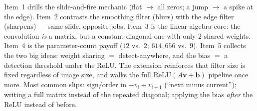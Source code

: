 \documentclass[10pt]{article}
\newcommand{\vv}{\mathbf{v}}
\newcommand{\bb}{\mathbf{b}}
\newcommand{\relu}{\mathrm{ReLU}}
\begin{document}
\begin{teachernote}
Item~1 drills the slide-and-fire mechanic (flat $\to$ all zeros; a jump $\to$ a spike at the edge). Item~2
contrasts the smoothing filter (blurs) with the edge filter (sharpens) --- same slide, opposite jobs. Item~3
is the linear-algebra core: the convolution \emph{is} a matrix, but a constant-diagonal one with only $2$
shared weights. Item~4 is the parameter-count payoff ($12$ vs.\ $2$; $614{,}656$ vs.\ $9$). Item~5 collects
the two big ideas: weight sharing $=$ detect-anywhere, and the bias $=$ a detection threshold under the ReLU.
The extension reinforces that filter size is fixed regardless of image size, and walks the full
$\relu(A\vv+\bb)$ pipeline once more. Most common slips: sign/order in $-v_i+v_{i+1}$ (``next minus
current''); writing a full matrix instead of the repeated diagonal; applying the bias \emph{after} the ReLU
instead of before.
\end{teachernote}
\end{document}
